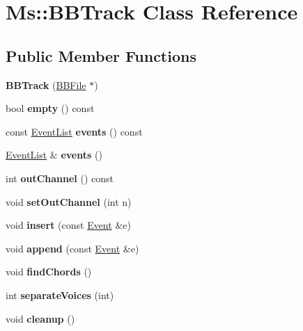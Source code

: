\hypertarget{class_ms_1_1_b_b_track}{}\section{Ms\+:\+:B\+B\+Track Class Reference}
\label{class_ms_1_1_b_b_track}
\subsection*{Public Member Functions}
\begin{DoxyCompactItemize}
\item 
\mbox{\label{class_ms_1_1_b_b_track_a1ef1ff6e7192aad53dfcc0b4f642eb93}} 
{\bfseries B\+B\+Track} (\hyperlink{class_ms_1_1_b_b_file}{B\+B\+File} $\ast$)
\item 
\mbox{\label{class_ms_1_1_b_b_track_a0b769290abb10e1c2acb4a6408492ee4}} 
bool {\bfseries empty} () const
\item 
\mbox{\label{class_ms_1_1_b_b_track_af0ebd8571c772477c761a5b514cce370}} 
const \hyperlink{class_ms_1_1_event_list}{Event\+List} {\bfseries events} () const
\item 
\mbox{\label{class_ms_1_1_b_b_track_af0f5ea8393a80a10a689e3f727266f9a}} 
\hyperlink{class_ms_1_1_event_list}{Event\+List} \& {\bfseries events} ()
\item 
\mbox{\label{class_ms_1_1_b_b_track_a233cd86ca413c326fe8243f5ab27ca13}} 
int {\bfseries out\+Channel} () const
\item 
\mbox{\label{class_ms_1_1_b_b_track_a2819dd4b80ac736802d98a743826b382}} 
void {\bfseries set\+Out\+Channel} (int n)
\item 
\mbox{\label{class_ms_1_1_b_b_track_a8ca7174bd4fd46b11ab5af3ada3fe5e3}} 
void {\bfseries insert} (const \hyperlink{class_ms_1_1_event}{Event} \&e)
\item 
\mbox{\label{class_ms_1_1_b_b_track_abd62639de336aa8c7a54ae1e5772d0f3}} 
void {\bfseries append} (const \hyperlink{class_ms_1_1_event}{Event} \&e)
\item 
\mbox{\label{class_ms_1_1_b_b_track_ac8d9d385a2bde04971e6b750b072c3a6}} 
void {\bfseries find\+Chords} ()
\item 
\mbox{\label{class_ms_1_1_b_b_track_a5e72d24f9047ca288c908027d40565a6}} 
int {\bfseries separate\+Voices} (int)
\item 
\mbox{\label{class_ms_1_1_b_b_track_a134fcbc4f10b34a0cd8f799229c40aef}} 
void {\bfseries cleanup} ()
\end{DoxyCompactItemize}
